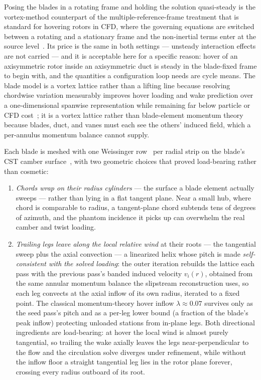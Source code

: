 \documentclass[]{aiaa-tc}%
\begin{document}
Posing the blades in a rotating frame and holding the solution
quasi-steady is the vortex-method counterpart of the
multiple-reference-frame treatment that is standard for hovering
rotors in CFD, where the governing equations are switched between a
rotating and a stationary frame and the non-inertial terms enter at
the source level~\cite{silva2021mrf}. Its price is the same in both
settings --- unsteady interaction effects are not carried --- and it
is acceptable here for a specific reason: hover of an axisymmetric
rotor inside an axisymmetric duct is steady in the blade-fixed frame
to begin with, and the quantities a configuration loop needs are
cycle means. The blade model is a vortex lattice rather than a
lifting line because resolving chordwise variation measurably
improves hover loading and wake prediction over a one-dimensional
spanwise representation while remaining far below particle or CFD
cost~\cite{lee2022,murua2012}; it is a vortex lattice rather than
blade-element momentum theory because blades, duct, and vanes must
each see the others' induced field, which a per-annulus momentum
balance cannot supply.

Each blade is meshed with one Weissinger row~\cite{weissinger1947}
per radial strip on the
blade's CST camber surface~\cite{kulfan2008}, with two geometric
choices that proved load-bearing rather than cosmetic:

\begin{enumerate}
\item \emph{Chords wrap on their radius cylinders} --- the surface a
blade element actually sweeps --- rather than lying in a flat tangent
plane. Near a small hub, where chord is comparable to radius, a
tangent-plane chord subtends tens of degrees of azimuth, and the
phantom incidence it picks up can overwhelm the real camber and twist
loading.
\item \emph{Trailing legs leave along the local relative wind} at
their roots --- the tangential sweep plus the axial convection --- a
linearized helix whose pitch is made \emph{self-consistent with the
solved loading}: the outer iteration rebuilds the lattice each pass with
the previous pass's banded induced velocity $v_i(r)$, obtained from
the same annular momentum balance the slipstream reconstruction uses,
so each leg convects at the axial inflow of its own radius, iterated
to a fixed point. The classical momentum-theory hover inflow
$\lambda \approx 0.07$ survives only as the seed pass's pitch and as a
per-leg lower bound (a fraction of the blade's peak inflow) protecting
unloaded stations from in-plane legs. Both directional ingredients are
load-bearing: at hover the local wind is almost purely tangential, so
trailing the wake axially leaves the legs near-perpendicular to the
flow and the circulation solve diverges under refinement, while
without the inflow floor a straight tangential leg lies in the rotor
plane forever, crossing every radius outboard of its root.
\end{enumerate}
\end{document}
